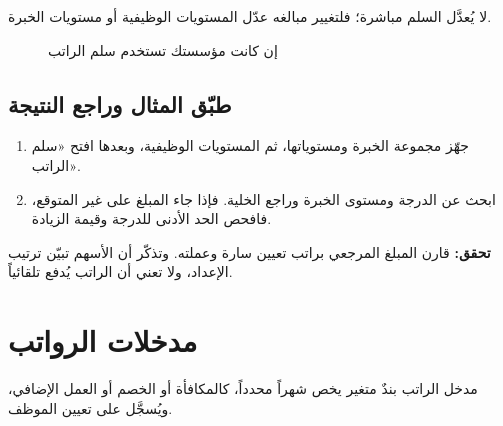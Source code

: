 لا يُعدَّل السلم مباشرة؛ فلتغيير مبالغه عدّل المستويات الوظيفية أو مستويات الخبرة.

\begin{figure}[H]
\centering
{}
\rclegend
\caption{إن كانت مؤسستك تستخدم سلم الراتب}
\label{fig:hr-scale-setup}
\end{figure}

\subsection{طبّق المثال وراجع النتيجة}

\begin{enumerate}
  \item جهّز مجموعة الخبرة ومستوياتها، ثم المستويات الوظيفية، وبعدها افتح «سلم الراتب».
  \item ابحث عن الدرجة ومستوى الخبرة وراجع الخلية. فإذا جاء المبلغ على غير المتوقع، فافحص الحد الأدنى للدرجة وقيمة الزيادة.
\end{enumerate}

\textbf{تحقق:} قارن المبلغ المرجعي براتب تعيين سارة وعملته. وتذكّر أن الأسهم تبيّن ترتيب الإعداد، ولا تعني أن الراتب يُدفع تلقائياً.

\clearpage
\section{مدخلات الرواتب}
\label{sec:hr-feature-payroll-inputs}

مدخل الراتب بندٌ متغير يخص شهراً محدداً، كالمكافأة أو الخصم أو العمل الإضافي، ويُسجَّل على تعيين الموظف.

